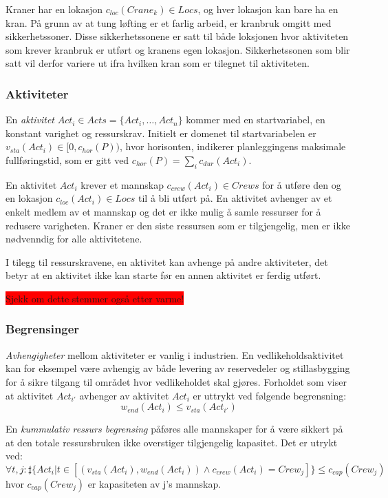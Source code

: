 Kraner har en lokasjon $ c_{loc}(Crane_{k}) \in Locs $, og hver lokasjon kan bare ha en kran. På grunn av at tung løfting er et farlig arbeid, er kranbruk omgitt med sikkerhetssoner. Disse sikkerhetssonene er satt til både loksjonen hvor aktiviteten som krever kranbruk er utført og kranens egen lokasjon. Sikkerhetssonen som blir satt vil derfor variere ut ifra hvilken kran som er tilegnet til aktiviteten.

\subsubsection{Aktiviteter}
En \textit{aktivitet} $ Act_{i} \in Acts = \{ Act_{i},\dots,Act_{n} \} $ kommer med en startvariabel, en konstant varighet og ressurskrav. Initielt er domenet til startvariabelen er $ v_{sta}(Act_{i}) \in [ 0, c_{hor}(P)) $, hvor horisonten, indikerer planleggingens maksimale fullføringstid, som er gitt ved $ c_{hor}(P) = \sum_{i} c_{dur}(Act_{i}) $.

En aktivitet $ Act_{i} $ krever et mannskap $ c_{crew}(Act_{i}) \in Crews $ for å utføre den og en lokasjon $ c_{loc}(Act_{i}) \in Locs $ til å bli utført på. En aktivitet avhenger av et enkelt medlem av et mannskap og det er ikke mulig å samle ressurser for å redusere varigheten. Kraner er den siste ressursen som er tilgjengelig, men er ikke nødvenndig for alle aktivitetene.

I tilegg til ressurskravene, en aktivitet kan avhenge på andre aktiviteter, det betyr at en aktivitet ikke kan starte før en annen aktivitet er ferdig utført.

\colorbox{red}{Sjekk om dette stemmer også etter varme!}

\subsubsection{Begrensinger}
\textit{Avhengigheter} mellom aktiviteter er vanlig i industrien. En vedlikeholdsaktivitet kan for eksempel være avhengig av både levering av reservedeler og stillasbygging for å sikre tilgang til området hvor vedlikeholdet skal gjøres. Forholdet som viser at aktivitet $ Act_{i'} $ avhenger av aktivitet $ Act_{i} $ er uttrykt ved følgende begrensning: 
\begin{equation}
w_{end}(Act_{i}) \leq v_{sta}(Act_{i'})
\end{equation}

En \textit{kummulativ ressurs begrensing} påføres alle mannskaper for å være sikkert på at den totale ressursbruken ikke overstiger tilgjengelig kapasitet. Det er utrykt ved: 
\begin{equation}
\forall t,j : \sharp \{ Act_{i} | t \in [(v_{sta}(Act_{i}), w_{end}(Act_{i})) \wedge c_{crew}(Act_{i}) = Crew_{j}] \} \leq c_{cap}(Crew_{j})
\end{equation}
hvor $ c_{cap}(Crew_{j}) $ er kapasiteten av j's mannskap.

